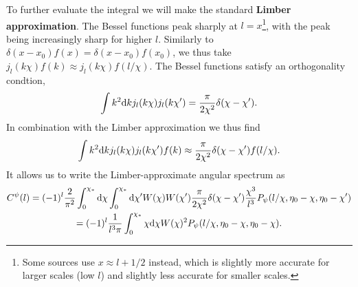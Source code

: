 \documentclass[11pt]{article} %
\DeclareRobustCommand{\d}{\ifmmode\text{d}\else d\fi}
\begin{document}
To further evaluate the integral we will make the standard \textbf{Limber approximation}. The Bessel functions peak sharply at $l=x$\footnote{Some sources use $x\approx l+1/2$ instead, which is slightly more accurate for larger scales (low $l$) and slightly less accurate for smaller scales.}, with the peak being increasingly sharp for higher $l$. Similarly to $\delta(x-x_0)f(x)=\delta(x-x_0)f(x_0)$, we thus take $j_l(k\chi)f(k)\approx j_l(k\chi)f(l/\chi)$. The Bessel functions satisfy an orthogonality condtion,
\begin{equation}
    \int k^2\d k j_l(k\chi)j_l(k\chi') = \frac{\pi}{2\chi^2}\delta(\chi-\chi').
\end{equation}
In combination with the Limber approximation we thus find
\begin{equation}
    \int k^2\d k j_l(k\chi)j_l(k\chi')f(k) \approx \frac{\pi}{2\chi^2}\delta(\chi-\chi')f(l/\chi).
\end{equation}
It allows us to write the Limber-approximate angular spectrum as
\begin{gather}
    C^\psi(l) = (-1)^{l}\frac{2}{\pi^2}\int_0^{\chi_*}\d \chi\int_0^{\chi_*}\d \chi' W(\chi)W(\chi') \frac{\pi}{2\chi^2}\delta(\chi-\chi')\frac{\chi^3}{l^3}P_\psi(l/\chi,\eta_0 - \chi, \eta_0-\chi')\\
    = (-1)^{l}\frac{1}{l^3\pi}\int_0^{\chi_*}\chi\d \chi W(\chi)^2 P_\psi(l/\chi,\eta_0 - \chi, \eta_0-\chi).
\end{gather}
\end{document}
